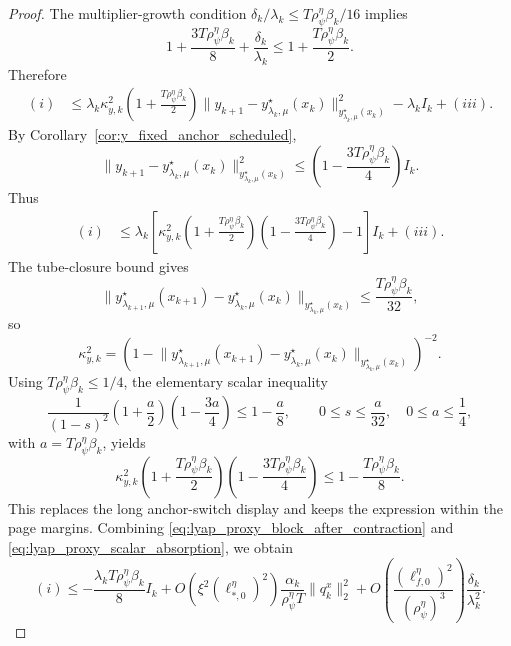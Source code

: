 \documentclass{article}
\begin{document}
\begin{proof}
The multiplier-growth condition \(\delta_k/\lambda_k\le T\rho_\psi^\eta\beta_k/16\) implies
\[
1+\frac{3T\rho_\psi^\eta\beta_k}{8}+\frac{\delta_k}{\lambda_k}
\le
1+\frac{T\rho_\psi^\eta\beta_k}{2}.
\]
Therefore
\begin{align}
(i)
&\le
\lambda_k\kappa_{y,k}^2
\left(1+\frac{T\rho_\psi^\eta\beta_k}{2}\right)
\big\|y_{k+1}-y_{\lambda_k,\mu}^\star(x_k)\big\|_{y_{\lambda_k,\mu}^\star(x_k)}^2
-\lambda_k I_k
+
(iii).
\label{eq:lyap_proxy_block_simplified}
\end{align}
By Corollary~\ref{cor:y_fixed_anchor_scheduled},
\[
\big\|y_{k+1}-y_{\lambda_k,\mu}^\star(x_k)\big\|_{y_{\lambda_k,\mu}^\star(x_k)}^2
\le
\left(1-\frac{3T\rho_\psi^\eta\beta_k}{4}\right)I_k .
\]
Thus
\begin{align}
(i)
&\le
\lambda_k
\left[
\kappa_{y,k}^2
\left(1+\frac{T\rho_\psi^\eta\beta_k}{2}\right)
\left(1-\frac{3T\rho_\psi^\eta\beta_k}{4}\right)
-1
\right]I_k
+
(iii).
\label{eq:lyap_proxy_block_after_contraction}
\end{align}
The tube-closure bound gives
\[
\big\|y_{\lambda_{k+1},\mu}^\star(x_{k+1})
-
y_{\lambda_k,\mu}^\star(x_k)\big\|_{y_{\lambda_k,\mu}^\star(x_k)}
\le
\frac{T\rho_\psi^\eta\beta_k}{32},
\]
so
\[
\kappa_{y,k}^2
=
\left(
1-
\big\|y_{\lambda_{k+1},\mu}^\star(x_{k+1})
-
y_{\lambda_k,\mu}^\star(x_k)\big\|_{y_{\lambda_k,\mu}^\star(x_k)}
\right)^{-2}.
\]
Using \(T\rho_\psi^\eta\beta_k\le 1/4\), the elementary scalar inequality
\[
\frac{1}{(1-s)^2}\left(1+\frac{a}{2}\right)\left(1-\frac{3a}{4}\right)
\le
1-\frac{a}{8},
\qquad
0\le s\le \frac{a}{32},\quad 0\le a\le \frac14,
\]
with \(a=T\rho_\psi^\eta\beta_k\), yields
\begin{equation}
\label{eq:lyap_proxy_scalar_absorption}
\kappa_{y,k}^2
\left(1+\frac{T\rho_\psi^\eta\beta_k}{2}\right)
\left(1-\frac{3T\rho_\psi^\eta\beta_k}{4}\right)
\le
1-\frac{T\rho_\psi^\eta\beta_k}{8}.
\end{equation}
This replaces the long anchor-switch display and keeps the expression within the page margins.
Combining \eqref{eq:lyap_proxy_block_after_contraction} and
\eqref{eq:lyap_proxy_scalar_absorption}, we obtain
\begin{equation}
\label{eq:lyap_proxy_block_final}
(i)
\le
-\frac{\lambda_kT\rho_\psi^\eta\beta_k}{8}I_k
+
O\!\left(\xi^2(\ell_{*,0}^\eta)^2\right)
\frac{\alpha_k}{\rho_\psi^\eta T}\|q_k^x\|_2^2
+
O\!\left(\frac{(\ell_{f,0}^\eta)^2}{(\rho_\psi^\eta)^3}\right)
\frac{\delta_k}{\lambda_k^2}.
\end{equation}


\end{proof}
\end{document}
